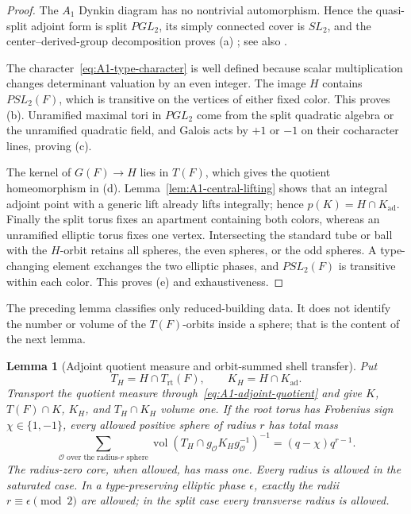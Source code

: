 \documentclass[11pt]{article}
\newtheorem{lemma}[theorem]{Lemma}
\theoremstyle{definition}
\theoremstyle{remark}
\newcommand{\rt}{\mathrm{rt}}
\newcommand{\ad}{\mathrm{ad}}
\newcommand{\vol}{\operatorname{vol}}
\begin{document}
\begin{proof}
The $A_1$ Dynkin diagram has no nontrivial automorphism.  Hence the
quasi-split adjoint form is split $PGL_2$, its simply connected cover is
$SL_2$, and the center--derived-group decomposition proves (a)
\cite[Proposition~20.32 and Theorem~23.51]{MilneAlgebraicGroups}; see also
\cite[Appendix~C.4]{ConradReductiveGroups}.

The character~\eqref{eq:A1-type-character} is well defined because scalar
multiplication changes determinant valuation by an even integer.  The image
$H$ contains $PSL_2(F)$, which is transitive on the vertices of either fixed
color.  This proves (b).  Unramified maximal tori in $PGL_2$ come from the
split quadratic algebra or the unramified quadratic field, and Galois acts
by $+1$ or $-1$ on their cocharacter lines, proving (c).

The kernel of $G(F)\to H$ lies in $T(F)$, which gives the quotient
homeomorphism in (d).  Lemma~\ref{lem:A1-central-lifting} shows that an
integral adjoint point with a generic lift already lifts integrally; hence
$p(K)=H\cap K_{\ad}$.  Finally the split torus fixes an apartment containing
both colors, whereas an unramified elliptic torus fixes one vertex.
Intersecting the standard tube or ball with the $H$-orbit retains all
spheres, the even spheres, or the odd spheres.  A type-changing element
exchanges the two elliptic phases, and $PSL_2(F)$ is transitive within each
color.  This proves (e) and exhaustiveness.
\end{proof}

The preceding lemma classifies only reduced-building data.  It does not
identify the number or volume of the $T(F)$-orbits inside a sphere; that is
the content of the next lemma.

\begin{lemma}[Adjoint quotient measure and orbit-summed shell transfer]
\label{lem:A1-shell-transfer}
Put
\[
 T_H=H\cap T_{\rt}(F),\qquad K_H=H\cap K_{\ad}.
\]
Transport the quotient measure through~\eqref{eq:A1-adjoint-quotient} and
give $K$, $T(F)\cap K$, $K_H$, and $T_H\cap K_H$ volume one.  If the root
torus has Frobenius sign $\chi\in\{1,-1\}$, every allowed positive sphere of
radius $r$ has total mass
\begin{equation}
 \sum_{\mathcal O\text{ over the radius-}r\text{ sphere}}
 \vol(T_H\cap g_{\mathcal O}K_Hg_{\mathcal O}^{-1})^{-1}
 =(q-\chi)q^{r-1}.
 \label{eq:A1-orbit-summed-shell}
\end{equation}
The radius-zero core, when allowed, has mass one.  Every radius is allowed in
the saturated case.  In a type-preserving elliptic phase $\epsilon$, exactly
the radii $r\equiv\epsilon\pmod2$ are allowed; in the split case every
transverse radius is allowed.
\end{lemma}
\end{document}

